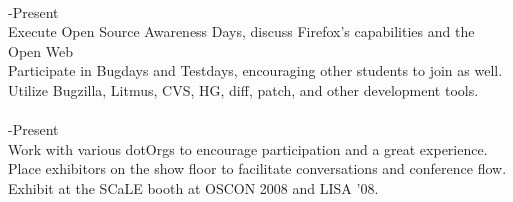 \documentclass{res}
\begin{document}
\begin{resume}
\begin{tabbing}
\\

    \hspace{-0.25in}{\bf Campus Rep, Mozilla Firefox} \> -Present\\
	 Execute Open Source Awareness Days, discuss Firefox's capabilities and the Open Web \\
	 Participate in Bugdays and Testdays, encouraging other students to join as well. \\
	 Utilize Bugzilla, Litmus, CVS, HG, diff, patch, and other development tools.\\

\\

    \hspace{-0.25in}{\bf Community Relations Committee, Southern California Linux Expo} \> -Present\\
	 Work with various dotOrgs to encourage participation and a great experience.\\
	 Place exhibitors on the show floor to facilitate conversations and conference flow.\\
	 Exhibit at the SCaLE booth at OSCON 2008 and LISA '08.
	 \end{tabbing}

\end{resume}
\end{document}

